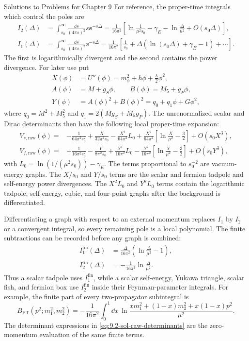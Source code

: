 \begin{bankssolutions}{Solutions to Problems for Chapter 9}
For reference, the proper-time integrals which control the poles are
\begin{align*}
 I_2(\Delta)&=\int_{s_0}^{\infty}\frac{\dd s}{(4\pi s)^2}s\ee^{-s\Delta}
 =\frac{1}{16\pi^2}\left[
 \ln\frac{1}{\mu^2s_0}-\gamma_E-\ln\frac{\Delta}{\mu^2}
 +O(s_0\Delta)\right],\\
 I_1(\Delta)&=\int_{s_0}^{\infty}\frac{\dd s}{(4\pi s)^2}\ee^{-s\Delta}
 =\frac{1}{16\pi^2}\left[
 \frac1{s_0}+\Delta\left(\ln(s_0\Delta)+\gamma_E-1\right)+\cdots\right].
 \end{align*}
The first is logarithmically divergent and the second contains the power
divergence.  For later use put
\begin{align*}
 X(\phi)&=U''(\phi)=m_\phi^2+h\phi+\frac{\lambda}{2}\phi^2,\\
 A(\phi)&=M+g_S\phi,\qquad B(\phi)=M_5+g_P\phi,\\
 Y(\phi)&=A(\phi)^2+B(\phi)^2
 =q_0+q_1\phi+G\phi^2,
\end{align*}
where $q_0=M^2+M_5^2$ and
$q_1=2(Mg_S+M_5g_P)$.  The unrenormalized scalar and Dirac determinants
then have the following local proper-time expansion:
\begin{align}
 V_{s,\mathrm{raw}}(\phi)={}&-\frac{1}{64\pi^2s_0^2}
 +\frac{X}{32\pi^2s_0}-\frac{X^2}{64\pi^2}L_0
 +\frac{X^2}{64\pi^2}
 \left[\ln\frac{X}{\mu^2}-\frac32\right]+O(s_0X^3),\nonumber\\
 V_{f,\mathrm{raw}}(\phi)={}&+\frac{1}{16\pi^2s_0^2}
 -\frac{Y}{8\pi^2s_0}+\frac{Y^2}{16\pi^2}L_0
 -\frac{Y^2}{16\pi^2}
 \left[\ln\frac{Y}{\mu^2}-\frac32\right]+O(s_0Y^3),
 \label{eq:9.2-sol-raw-determinants}
\end{align}
with $L_0=\ln(1/(\mu^2s_0))-\gamma_E$.  The terms proportional to
$s_0^{-2}$ are vacuum-energy graphs.  The $X/s_0$ and $Y/s_0$ terms are
the scalar and fermion tadpole and self-energy power divergences.  The
$X^2L_0$ and $Y^2L_0$ terms contain the logarithmic tadpole, self-energy,
cubic, and four-point graphs after the background is differentiated.

Differentiating a graph with respect to an external momentum replaces $I_1$
by $I_2$ or a convergent integral, so every remaining pole is a local
polynomial.  The finite subtractions can be recorded before any graph is
combined:
\begin{align*}
 I_1^{\mathrm{fin}}(\Delta)&=
 \frac{\Delta}{16\pi^2}\left(\ln\frac{\Delta}{\mu^2}-1\right),\\
 I_2^{\mathrm{fin}}(\Delta)&=-\frac{1}{16\pi^2}\ln\frac{\Delta}{\mu^2}.
\end{align*}
Thus a scalar tadpole uses $I_1^{\mathrm{fin}}$, while a scalar self-energy,
Yukawa triangle, scalar fish, and fermion box use $I_2^{\mathrm{fin}}$
inside their Feynman-parameter integrals.  For example, the finite part of
every two-propagator subintegral is
\[
 B_{\mathrm{PT}}(p^2;m_1^2,m_2^2)
 =-\frac{1}{16\pi^2}\int_0^1\dd x\,
 \ln\frac{x m_1^2+(1-x)m_2^2+x(1-x)p^2}{\mu^2}.
\]
The determinant expressions in \eqref{eq:9.2-sol-raw-determinants} are the
zero-momentum evaluation of the same finite terms.


\end{bankssolutions}
